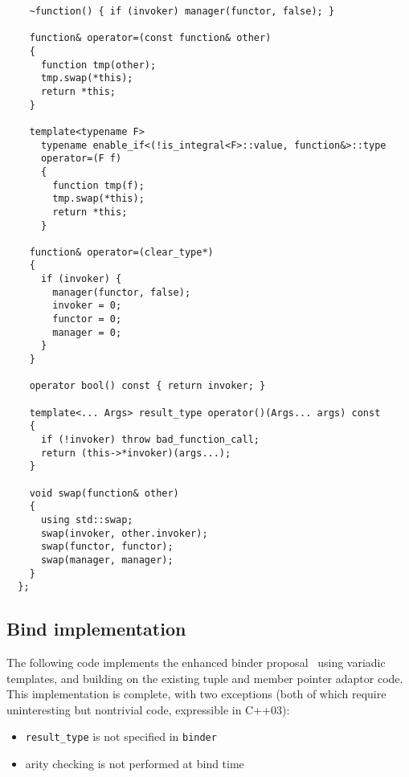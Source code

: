 \documentclass{article}
\begin{document}
\begin{verbatim}
    ~function() { if (invoker) manager(functor, false); }

    function& operator=(const function& other)
    {
      function tmp(other);
      tmp.swap(*this);
      return *this;
    }
    
    template<typename F> 
      typename enable_if<(!is_integral<F>::value, function&>::type
      operator=(F f)
      {
        function tmp(f);
        tmp.swap(*this);
        return *this;
      }
    
    function& operator=(clear_type*)
    {
      if (invoker) { 
        manager(functor, false);
        invoker = 0;
        functor = 0;
        manager = 0;
      }
    }

    operator bool() const { return invoker; }

    template<... Args> result_type operator()(Args... args) const
    {
      if (!invoker) throw bad_function_call;
      return (this->*invoker)(args...);
    }
    
    void swap(function& other)
    {
      using std::swap;
      swap(invoker, other.invoker);
      swap(functor, functor);
      swap(manager, manager);
    }
  };
\end{verbatim}
\normalsize

\subsection{Bind implementation}
\label{bindimpl}
The following code implements the enhanced binder
proposal~\cite{Dimov03b} using variadic templates, and building on the
existing tuple and member pointer adaptor code. This implementation is
complete, with two exceptions (both of which require uninteresting but
nontrivial code, expressible in C++03):
\begin{itemize}
  \item {\tt result\_type} is not specified in {\tt binder}
  \item arity checking is not performed at bind time
\end{itemize}
\end{document}
